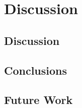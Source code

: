 \chapter{Discussion}
\label{chap:discussion}
\section{Discussion}

\section{Conclusions}

\section{Future Work}

\cleardoublepage


